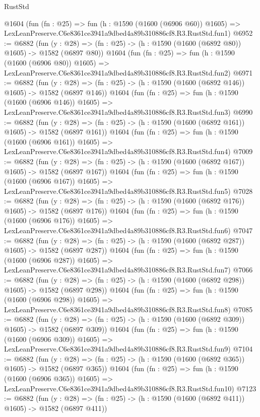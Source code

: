 \begin{lexlean}{RustStd}
\begin{coremodule}
    @1604
    (fun (fn : @25) =>
    fun (h : @1590 (@1600 (@6906 @60)) @1605) =>
    LexLeanPreserve.C6e8361ce3941a9dbed4a89b310886cf8.R3.RustStd.fun1)
@6952 := @6882
    (fun (y : @28) => (fn : @25) -> (h : @1590 (@1600 (@6892 @80)) @1605) -> @1582 (@6897 @80))
    @1604
    (fun (fn : @25) =>
    fun (h : @1590 (@1600 (@6906 @80)) @1605) =>
    LexLeanPreserve.C6e8361ce3941a9dbed4a89b310886cf8.R3.RustStd.fun2)
@6971 := @6882
    (fun (y : @28) => (fn : @25) -> (h : @1590 (@1600 (@6892 @146)) @1605) -> @1582 (@6897 @146))
    @1604
    (fun (fn : @25) =>
    fun (h : @1590 (@1600 (@6906 @146)) @1605) =>
    LexLeanPreserve.C6e8361ce3941a9dbed4a89b310886cf8.R3.RustStd.fun3)
@6990 := @6882
    (fun (y : @28) => (fn : @25) -> (h : @1590 (@1600 (@6892 @161)) @1605) -> @1582 (@6897 @161))
    @1604
    (fun (fn : @25) =>
    fun (h : @1590 (@1600 (@6906 @161)) @1605) =>
    LexLeanPreserve.C6e8361ce3941a9dbed4a89b310886cf8.R3.RustStd.fun4)
@7009 := @6882
    (fun (y : @28) => (fn : @25) -> (h : @1590 (@1600 (@6892 @167)) @1605) -> @1582 (@6897 @167))
    @1604
    (fun (fn : @25) =>
    fun (h : @1590 (@1600 (@6906 @167)) @1605) =>
    LexLeanPreserve.C6e8361ce3941a9dbed4a89b310886cf8.R3.RustStd.fun5)
@7028 := @6882
    (fun (y : @28) => (fn : @25) -> (h : @1590 (@1600 (@6892 @176)) @1605) -> @1582 (@6897 @176))
    @1604
    (fun (fn : @25) =>
    fun (h : @1590 (@1600 (@6906 @176)) @1605) =>
    LexLeanPreserve.C6e8361ce3941a9dbed4a89b310886cf8.R3.RustStd.fun6)
@7047 := @6882
    (fun (y : @28) => (fn : @25) -> (h : @1590 (@1600 (@6892 @287)) @1605) -> @1582 (@6897 @287))
    @1604
    (fun (fn : @25) =>
    fun (h : @1590 (@1600 (@6906 @287)) @1605) =>
    LexLeanPreserve.C6e8361ce3941a9dbed4a89b310886cf8.R3.RustStd.fun7)
@7066 := @6882
    (fun (y : @28) => (fn : @25) -> (h : @1590 (@1600 (@6892 @298)) @1605) -> @1582 (@6897 @298))
    @1604
    (fun (fn : @25) =>
    fun (h : @1590 (@1600 (@6906 @298)) @1605) =>
    LexLeanPreserve.C6e8361ce3941a9dbed4a89b310886cf8.R3.RustStd.fun8)
@7085 := @6882
    (fun (y : @28) => (fn : @25) -> (h : @1590 (@1600 (@6892 @309)) @1605) -> @1582 (@6897 @309))
    @1604
    (fun (fn : @25) =>
    fun (h : @1590 (@1600 (@6906 @309)) @1605) =>
    LexLeanPreserve.C6e8361ce3941a9dbed4a89b310886cf8.R3.RustStd.fun9)
@7104 := @6882
    (fun (y : @28) => (fn : @25) -> (h : @1590 (@1600 (@6892 @365)) @1605) -> @1582 (@6897 @365))
    @1604
    (fun (fn : @25) =>
    fun (h : @1590 (@1600 (@6906 @365)) @1605) =>
    LexLeanPreserve.C6e8361ce3941a9dbed4a89b310886cf8.R3.RustStd.fun10)
@7123 := @6882
    (fun (y : @28) => (fn : @25) -> (h : @1590 (@1600 (@6892 @411)) @1605) -> @1582 (@6897 @411))

\end{coremodule}
\end{lexlean}
